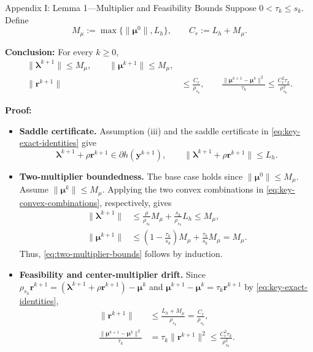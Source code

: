 \documentclass[handout,compress,9pt]{beamer}
\newcommand{\blue}[1]{\textcolor{ddlblue}{#1}}
\newcommand{\by}{\bm{y}}
\newcommand{\br}{\bm{r}}
\newcommand{\bmu}{\bm{\mu}}
\newcommand{\blmbd}{\bm{\lambda}}
\begin{document}
\begin{frame}{Appendix I: Lemma 1---Multiplier and Feasibility Bounds
\hfill\hyperlink{appendix:contents}{}}
\hypertarget{appendix:lemmas}{}
\label{app:lemmas}
\scriptsize
Suppose $0<\tau_k\le s_k$. Define
\begin{equation*}
  M_\mu:=\max\{\|\bmu^0\|,L_h\},
  \qquad C_r:=L_h+M_\mu.
\end{equation*}

\noindent\textbf{Conclusion:} For every $k\ge0$,
\begin{align}
  \|\blmbd^{k+1}\|\le M_\mu,
  \qquad
  \|\bmu^{k+1}\|\le M_\mu,
  \label{eq:two-multiplier-bounds}\\
  \|\br^{k+1}\|
  &\le\frac{C_r}{\rho_{s_k}},
  \qquad
  \frac{\|\bmu^{k+1}-\bmu^k\|^2}{\tau_k}
  \le\frac{C_r^2\tau_k}{\rho_{s_k}^2}.
  \label{eq:feasibility-drift-control}
\end{align}

\noindent\textbf{Proof:}
\begin{itemize}
\setlength{\itemsep}{0.06cm}

\item[\blue{$\triangleright$}]
\textbf{Saddle certificate.}
Assumption (iii) and the saddle certificate in
\eqref{eq:key-exact-identities} give
\begin{equation*}
  \blmbd^{k+1}+\rho\br^{k+1}\in\partial h(\by^{k+1}),
  \qquad
  \|\blmbd^{k+1}+\rho\br^{k+1}\|\le L_h.
\end{equation*}

\item[\blue{$\triangleright$}]
\textbf{Two-multiplier boundedness.}
The base case holds since $\|\bmu^0\|\le M_\mu$.
Assume $\|\bmu^k\|\le M_\mu$.
Applying the two convex combinations in
\eqref{eq:key-convex-combinations}, respectively, gives
\begin{equation*}
\begin{aligned}
  \|\blmbd^{k+1}\|
  &\le \frac{\rho}{\rho_{s_k}}M_\mu
  +\frac{s_k}{\rho_{s_k}}L_h
  \le M_\mu, \\
  \|\bmu^{k+1}\|
  &\le \left(1-\frac{\tau_k}{s_k}\right)M_\mu
  +\frac{\tau_k}{s_k}M_\mu
  =M_\mu.
\end{aligned}
\end{equation*}
Thus, \eqref{eq:two-multiplier-bounds} follows by induction.

\item[\blue{$\triangleright$}]
\textbf{Feasibility and center-multiplier drift.}
Since $\rho_{s_k}\br^{k+1}
 =(\blmbd^{k+1}+\rho\br^{k+1})-\bmu^k$ and
$\bmu^{k+1}-\bmu^k=\tau_k\br^{k+1}$ by
\eqref{eq:key-exact-identities},
\begin{equation*}
\begin{aligned}
  \|\br^{k+1}\|
  &\le\frac{L_h+M_\mu}{\rho_{s_k}}
  =\frac{C_r}{\rho_{s_k}},\\
  \frac{\|\bmu^{k+1}-\bmu^k\|^2}{\tau_k}
  &=\tau_k\|\br^{k+1}\|^2
  \leq\frac{C_r^2\tau_k}{\rho_{s_k}^2}.
\end{aligned}
\end{equation*}
\end{itemize}

\end{frame}
\end{document}
